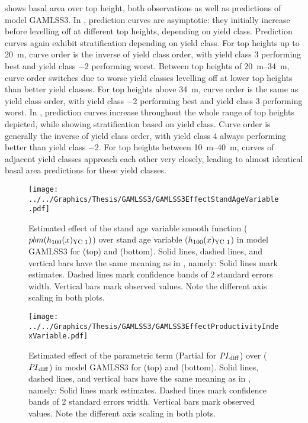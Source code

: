  shows basal area over top height, both observations as well as predictions of model GAMLSS3.  In \Beech{}, prediction curves are asymptotic:  they initially increase before levelling off at different top heights, depending on yield class. Prediction curves again exhibit stratification depending on yield class.   For top heights up to \SI{20}{\meter}, curve order is the inverse of yield class order, with yield class \num{3} performing best and yield class \num{-2} performing worst.  Between top heights of \SIrange{20}{34}{\meter}, curve order switches due to worse yield classes levelling off at lower top heights than better yield classes. For top heights above \SI{34}{\meter}, curve order is the same as yield class order, with yield class \num{-2} performing best and yield class \num{3} performing worst.  In \Spruce{}, prediction curves increase throughout the whole range of top heights depicted, while showing stratification based on yield class.  Curve order is generally the inverse of yield class order, with yield class \num{4} always performing better than yield class \num{-2}.  For top heights between \SIrange{10}{40}{\meter}, curves of adjacent yield classes approach each other very closely, leading to almost identical basal area predictions for these yield classes.

\begin{figure}[h]
  \centering
  \texttt{[image: ../../Graphics/Thesis/GAMLSS3/GAMLSS3EffectStandAgeVariable.pdf]}
  \caption{Estimated effect of the stand age variable smooth function (\(pbm(h_{100}(x)_{\text{YC 1}}{})\)) over stand age variable (\(h_{100}(x)_{\text{YC 1}}{}\)) in model GAMLSS3 for \Beech{} (top) and \Spruce{} (bottom).  Solid lines, dashed lines, and vertical bars have the same meaning as in , namely:  Solid lines mark estimates.  Dashed lines mark confidence bands of 2 standard errors width.  Vertical bars mark observed values.  Note the different axis scaling in both plots.}
  \label{fig:GAMLSS3EffectStandAgeVariable}
\end{figure}

\begin{figure}[h]
  \centering
  \texttt{[image: ../../Graphics/Thesis/GAMLSS3/GAMLSS3EffectProductivityIndexVariable.pdf]}
  \caption{Estimated effect of the parametric \ProductivityIndexVariableText{} term (Partial for \(\mathit{PI}_{\text{diff}}{}\)) over \ProductivityIndexVariableText{} (\(\mathit{PI}_{\text{diff}}{}\)) in model GAMLSS3 for \Beech{} (top) and \Spruce{} (bottom).  Solid lines, dashed lines, and vertical bars have the same meaning as in , namely:  Solid lines mark estimates.  Dashed lines mark confidence bands of 2 standard errors width.  Vertical bars mark observed values.  Note the different axis scaling in both plots.}
  \label{fig:GAMLSS3EffectProductivityIndexVariable}
\end{figure}

